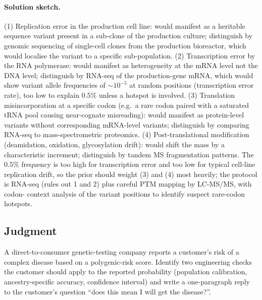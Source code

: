 \paragraph{Solution sketch.} (1) Replication error in the production
cell line: would manifest as a heritable sequence variant present in
a sub-clone of the production culture; distinguish by genomic
sequencing of single-cell clones from the production bioreactor,
which would localise the variant to a specific sub-population.
(2) Transcription error by the RNA polymerase: would manifest as
heterogeneity at the mRNA level not the DNA level; distinguish by
RNA-seq of the production-gene mRNA, which would show variant
allele frequencies of $\sim 10^{-5}$ at random positions (transcription
error rate), too low to explain $0.5\%$ unless a hotspot is involved.
(3) Translation misincorporation at a specific codon (e.g.\ a rare
codon paired with a saturated tRNA pool causing near-cognate
misreading): would manifest as protein-level variants without
corresponding mRNA-level variants; distinguish by comparing RNA-seq
to mass-spectrometric proteomics. (4) Post-translational modification
(deamidation, oxidation, glycosylation drift): would shift the mass
by a characteristic increment; distinguish by tandem MS fragmentation
patterns. The $0.5\%$ frequency is too high for transcription error
and too low for typical cell-line replication drift, so the prior
should weight (3) and (4) most heavily; the protocol is RNA-seq
(rules out 1 and 2) plus careful PTM mapping by LC-MS/MS, with codon-
context analysis of the variant positions to identify suspect
rare-codon hotspots.

\subsection*{Judgment}

\begin{exercise}
A direct-to-consumer genetic-testing company reports a customer's
risk of a complex disease based on a polygenic-risk score. Identify
two engineering checks the customer should apply to the reported
probability (population calibration, ancestry-specific accuracy,
confidence interval) and write a one-paragraph reply to the customer's
question ``does this mean I will get the disease?''.
\end{exercise}

